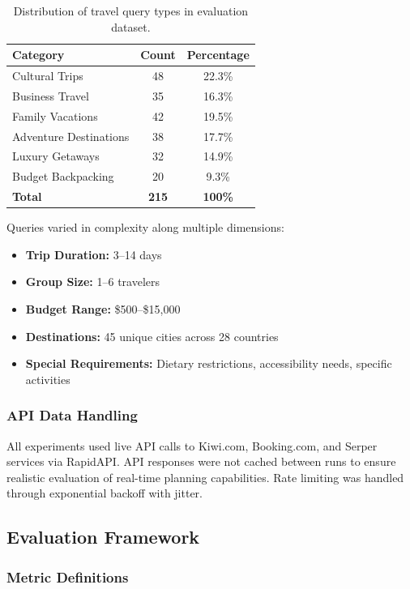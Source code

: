 \documentclass[preprint,review,12pt]{elsarticle}
\begin{document}
\begin{table}[h]
\centering
\caption{Distribution of travel query types in evaluation dataset.}
\label{tab:query_distribution}
\begin{tabular}{lcc}
\toprule
\textbf{Category} & \textbf{Count} & \textbf{Percentage} \\
\midrule
Cultural Trips & 48 & 22.3\% \\
Business Travel & 35 & 16.3\% \\
Family Vacations & 42 & 19.5\% \\
Adventure Destinations & 38 & 17.7\% \\
Luxury Getaways & 32 & 14.9\% \\
Budget Backpacking & 20 & 9.3\% \\
\midrule
\textbf{Total} & \textbf{215} & \textbf{100\%} \\
\bottomrule
\end{tabular}
\end{table}

Queries varied in complexity along multiple dimensions:
\begin{itemize}
    \item \textbf{Trip Duration:} 3--14 days
    \item \textbf{Group Size:} 1--6 travelers
    \item \textbf{Budget Range:} \$500--\$15,000
    \item \textbf{Destinations:} 45 unique cities across 28 countries
    \item \textbf{Special Requirements:} Dietary restrictions, accessibility needs, specific activities
\end{itemize}

\subsubsection{API Data Handling}

All experiments used live API calls to Kiwi.com, Booking.com, and Serper services via RapidAPI. API responses were not cached between runs to ensure realistic evaluation of real-time planning capabilities. Rate limiting was handled through exponential backoff with jitter.

\subsection{Evaluation Framework}

\subsubsection{Metric Definitions}
\end{document}
